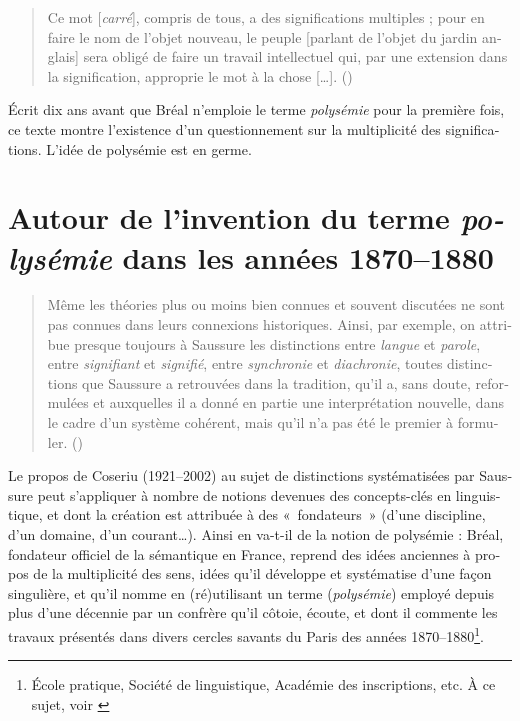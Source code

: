 \documentclass[output=paper]{langsci/langscibook}
\begin{document}
\begin{otherlanguage}{french}
\begin{quote}
Ce mot [\textit{carré}], compris de tous, a des significations multiples ; pour en faire le nom de l’objet nouveau, le peuple [parlant de l’objet du jardin anglais] sera obligé de faire un travail intellectuel qui, par une extension dans la signification, approprie le mot à la chose […]. (\citealt[33]{darmesteter_creation_1877})
\end{quote}

Écrit dix ans avant que Bréal n’emploie le terme \textit{polysémie} pour la première fois, ce texte montre l’existence d’un questionnement sur la multiplicité des significations. L’idée de polysémie est en germe.

\section{Autour de l’invention du terme \textit{polysémie} dans les années 1870--1880}

\begin{quote}        
Même les théories plus ou moins bien connues et souvent discutées ne sont pas connues dans leurs connexions historiques. Ainsi, par exemple, on attribue presque toujours à Saussure les distinctions entre \textit{langue} et \textit{parole}, entre \textit{signifiant} et \textit{signifié}, entre \textit{synchronie} et \textit{diachronie}, toutes distinctions que Saussure a retrouvées dans la tradition, qu’il a, sans doute, reformulées et auxquelles il a donné en partie une interprétation nouvelle, dans le cadre d’un système cohérent, mais qu’il n’a pas été le premier à formuler. (\citealt[74]{coseriu_georg_1967})
\end{quote}

Le propos de Coseriu (1921--2002) au sujet de distinctions systématisées par Saussure peut s’appliquer à nombre de notions devenues des concepts-clés en linguistique, et dont la création est attribuée à des «~fondateurs~» (d’une discipline, d’un domaine, d’un courant…). Ainsi en va-t-il de la notion de polysémie : Bréal, fondateur officiel de la sémantique en France, reprend des idées anciennes à propos de la multiplicité des sens, idées qu’il développe et systématise d’une façon singulière, et qu’il nomme en (ré)utilisant un terme (\textit{polysémie}) employé depuis plus d’une décennie par un confrère qu’il côtoie, écoute, et dont il commente les travaux présentés dans divers cercles savants du Paris des années 1870--1880\footnote{École pratique, Société de linguistique, Académie des inscriptions, etc. À ce sujet, voir \citealt{courbon_sur_2015}}.


\end{otherlanguage}
\end{document}
